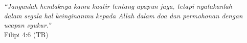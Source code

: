 \clearpage
{}%

\begin{Center}
	\centering \textit{``Janganlah hendaknya kamu kuatir tentang apapun juga, tetapi nyatakanlah dalam segala hal keinginanmu kepada Allah dalam doa dan permohonan dengan ucapan syukur.''}\\
	Filipi 4:6 (TB)
\end{Center}
 
\clearpage